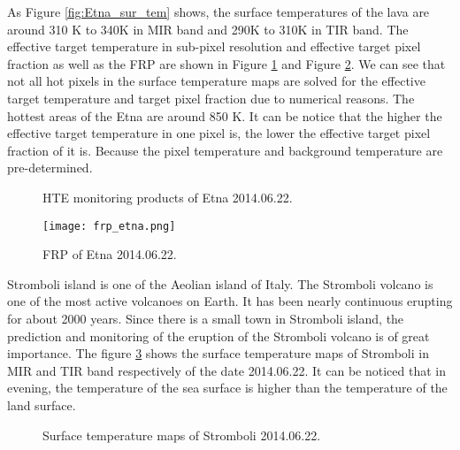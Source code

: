 \noindent As Figure \ref{fig:Etna_sur_tem} shows, the surface temperatures of the lava are around 310 K to 340K in MIR band and 290K to 310K in TIR band. The effective target temperature in sub-pixel resolution and effective target pixel fraction as well as the FRP are shown in Figure \ref{fig:Etna_HTE} and Figure \ref{fig:Etna_frp}. We can see that not all hot pixels in the surface temperature maps are solved for the effective target temperature and target pixel fraction due to numerical reasons. The hottest areas of the Etna are around 850 K. It can be notice that the higher the effective target temperature in one pixel is, the lower the effective target pixel fraction of it is. Because the pixel temperature and background temperature are pre-determined.\\

\begin{figure}[!htbp]
\centering
{}
\hspace{0.1in}
\caption{HTE monitoring products of Etna 2014.06.22.}
\label{fig:Etna_HTE}
\end{figure}

\begin{figure}[!htbp]
\centering
\texttt{[image: frp\_etna.png]}
\caption{FRP of Etna 2014.06.22.}
\label{fig:Etna_frp}
\end{figure}

\noindent Stromboli island is one of the Aeolian island of Italy. The Stromboli volcano is one of the most active volcanoes on Earth. It has been nearly continuous erupting for about 2000 years. Since there is a small town in Stromboli island, the prediction and monitoring of the eruption of the Stromboli volcano is of great importance. The figure \ref{fig:Strom_sur_tem} shows the surface temperature maps of Stromboli in MIR and TIR band respectively of the date 2014.06.22. It can be noticed that in evening, the temperature of the sea surface is higher than the temperature of the land surface.\\

\begin{figure}
\centering
{}
\hspace{0.1in}
\caption{Surface temperature maps of Stromboli 2014.06.22.}
\label{fig:Strom_sur_tem}
\end{figure}


